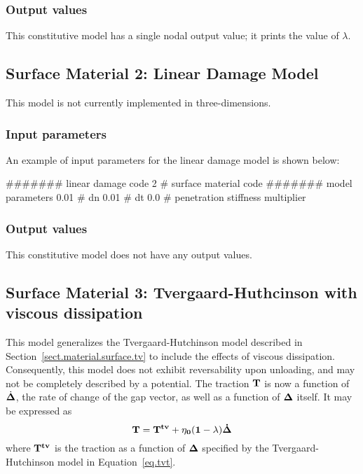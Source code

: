 \subsubsection{Output values}
This constitutive model has a single nodal output value; it prints the 
value of $\lambda$.

\subsection{Surface Material 2: Linear Damage Model}

This model is not currently implemented in three-dimensions.

\subsubsection{Input parameters}
An example of input parameters for the linear damage model is shown 
below:
\begin{inputfile}
####### linear damage code
2     # surface material code
####### model parameters
0.01  # dn
0.01  # dt
0.0   # penetration stiffness multiplier
\end{inputfile}

\subsubsection{Output values}
This constitutive model does not have any output values.

\subsection{Surface Material 3: Tvergaard-Huthcinson with viscous dissipation}
\label{sect.material.surface.tvvisc}
This model generalizes the Tvergaard-Hutchinson model 
described in Section~\ref{sect.material.surface.tv} to include the effects of 
viscous dissipation. Consequently, this model does not exhibit reversability 
upon unloading, and may not be completely described by a potential. 
The traction $\bf{T}$ is now a function of $\dot{\bf{\Delta}}$, 
the rate of change of the gap vector, as well as a function of $\bf{\Delta}$ itself.
It may be expressed as 
\begin{equation}
\bf{T} = \bf{T}^{tv} + \eta_0 (1-\lambda) \dot{\bf{\Delta}}
\end{equation}
where $\bf{T}^{tv}$ is the traction as a function of $\bf{\Delta}$ specified by
the Tvergaard-Hutchinson model in Equation~\eqref{eq.tvt}. 

